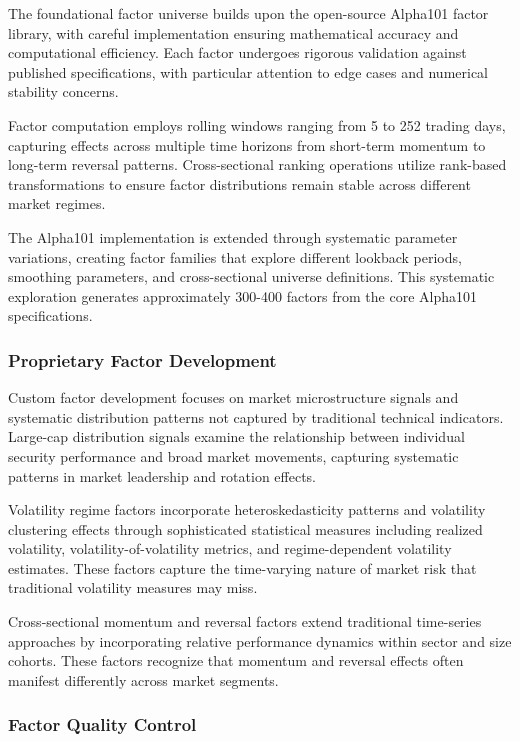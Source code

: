 \documentclass[conference]{IEEEtran}
\begin{document}
The foundational factor universe builds upon the open-source Alpha101 factor library, with careful implementation ensuring mathematical accuracy and computational efficiency. Each factor undergoes rigorous validation against published specifications, with particular attention to edge cases and numerical stability concerns.

Factor computation employs rolling windows ranging from 5 to 252 trading days, capturing effects across multiple time horizons from short-term momentum to long-term reversal patterns. Cross-sectional ranking operations utilize rank-based transformations to ensure factor distributions remain stable across different market regimes.

The Alpha101 implementation is extended through systematic parameter variations, creating factor families that explore different lookback periods, smoothing parameters, and cross-sectional universe definitions. This systematic exploration generates approximately 300-400 factors from the core Alpha101 specifications.

\subsubsection{Proprietary Factor Development}

Custom factor development focuses on market microstructure signals and systematic distribution patterns not captured by traditional technical indicators. Large-cap distribution signals examine the relationship between individual security performance and broad market movements, capturing systematic patterns in market leadership and rotation effects.

Volatility regime factors incorporate heteroskedasticity patterns and volatility clustering effects through sophisticated statistical measures including realized volatility, volatility-of-volatility metrics, and regime-dependent volatility estimates. These factors capture the time-varying nature of market risk that traditional volatility measures may miss.

Cross-sectional momentum and reversal factors extend traditional time-series approaches by incorporating relative performance dynamics within sector and size cohorts. These factors recognize that momentum and reversal effects often manifest differently across market segments.

\subsubsection{Factor Quality Control}
\end{document}
